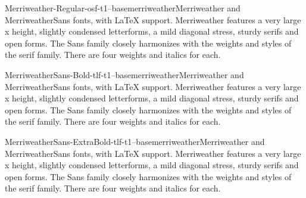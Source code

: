 \documentclass{ddltxtyp}
\begin{document}
\begin{package}{Merriweather-Regular-osf-t1--base}{merriweather}{Merriweather and MerriweatherSans fonts, with {\LaTeX} support.}
Merriweather features a very large x height, slightly condensed
letterforms, a mild diagonal stress, sturdy serifs and open
forms. The Sans family closely harmonizes with the weights and
styles of the serif family. There are four weights and italics
for each.
\end{package}
\begin{package}{MerriweatherSans-Bold-tlf-t1--base}{merriweather}{Merriweather and MerriweatherSans fonts, with {\LaTeX} support.}
Merriweather features a very large x height, slightly condensed
letterforms, a mild diagonal stress, sturdy serifs and open
forms. The Sans family closely harmonizes with the weights and
styles of the serif family. There are four weights and italics
for each.
\end{package}
\begin{package}{MerriweatherSans-ExtraBold-tlf-t1--base}{merriweather}{Merriweather and MerriweatherSans fonts, with {\LaTeX} support.}
Merriweather features a very large x height, slightly condensed
letterforms, a mild diagonal stress, sturdy serifs and open
forms. The Sans family closely harmonizes with the weights and
styles of the serif family. There are four weights and italics
for each.
\end{package}
\end{document}
